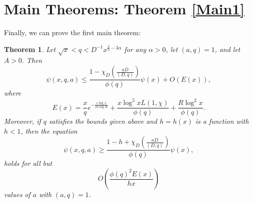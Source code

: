 \documentclass{amsart}
\newtheorem{theorem}{Theorem}[section]
\begin{document}
\section{Main Theorems: Theorem \ref{Main1}}
Finally, we can prove the first main theorem:
\begin{theorem}
Let $\sqrt x<q<D^{-1}x^{\frac 23-3\alpha}$ for any $\alpha>0$, let $(a,q)=1$, and let $A>0$.
Then
$$\psi(x,q,a)\leq \frac{1-\chi_D\left(\frac{aD}{(D,q)}\right)}{\phi(q)}\psi(x)+O(E(x)),$$
where
$$E(x)=\frac xqe^{-\frac{\varepsilon\log x}{24\log R}
}+\frac{x\log^5 xL(1,\chi)}{\phi(q)}+\frac{R\log^2 x}{\phi(q)}.$$
Moreover, if $q$ satisfies the bounds given above and $h=h(x)$ is a function with $h<1$, then the equation
$$\psi(x,q,a)\geq \frac{1-h+\chi_D\left(\frac{aD}{(D,q)}\right)}{\phi(q)}\psi(x),$$
holds for all but $$O\left(\frac{\phi(q)^2E(x)}{hx}\right)$$values of $a$ with $(a,q)=1$.
\end{theorem}
\end{document}
